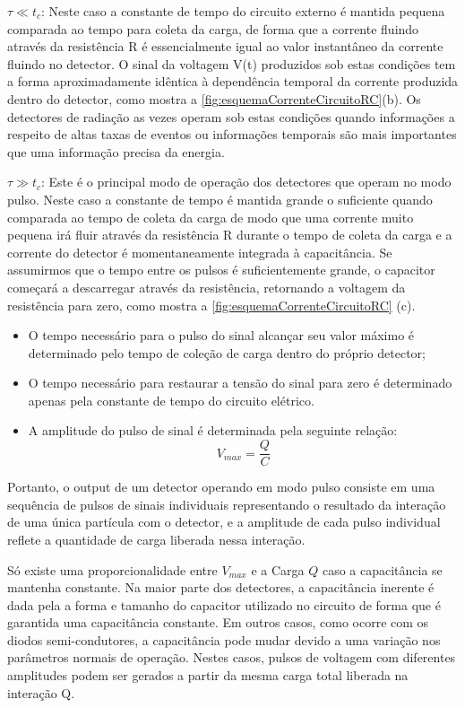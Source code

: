 \documentclass[11pt,a4paper]{article}
\begin{document}
			$\tau \ll t_c$: Neste caso a constante de tempo do circuito externo é mantida pequena comparada ao tempo para coleta da carga, de forma que a corrente fluindo através da resistência R é essencialmente igual ao valor instantâneo da corrente fluindo no detector. O sinal da voltagem V(t) produzidos sob estas condições tem a forma aproximadamente idêntica à dependência temporal da corrente produzida dentro do detector, como mostra a  \ref{fig:esquemaCorrenteCircuitoRC}(b). Os detectores de radiação as vezes operam sob estas condições quando informações a respeito de altas taxas de eventos ou informações temporais são mais importantes que uma informação precisa da energia.

			$\tau \gg t_c$: Este é o principal modo de operação dos detectores que operam no modo pulso. Neste caso a constante de tempo é mantida grande o suficiente quando comparada ao tempo de coleta da carga de modo que uma corrente muito pequena irá fluir através da resistência R durante o tempo de coleta da carga e a corrente do detector é momentaneamente integrada à capacitância. Se assumirmos que o tempo entre os pulsos é suficientemente grande, o capacitor começará a descarregar através da resistência, retornando a voltagem da resistência para zero, como mostra a  \ref{fig:esquemaCorrenteCircuitoRC} (c).


			\begin{itemize}
				\item O tempo necessário para o pulso do sinal alcançar seu valor máximo é determinado pelo tempo de coleção de carga dentro do próprio detector;
				\item O tempo necessário para restaurar a tensão do sinal para zero é determinado apenas pela constante de tempo do circuito elétrico.
				\item A amplitude do pulso de sinal é determinada pela seguinte relação:
					\begin{equation}
						V_{max} = \frac{Q}{C}
					\end{equation}
			\end{itemize}

			Portanto, o output de um detector operando em modo pulso consiste em uma sequência de pulsos de sinais individuais representando o resultado da interação de uma única partícula com o detector, e a amplitude de cada pulso individual reflete a quantidade de carga liberada nessa interação.

			Só existe uma proporcionalidade entre $V_{max}$ e a Carga $Q$ caso a capacitância se mantenha constante. Na maior parte dos detectores, a capacitância inerente é dada pela a forma e tamanho do capacitor utilizado no circuito de forma que é garantida uma capacitância constante. Em outros casos, como ocorre com os diodos semi-condutores, a capacitância pode mudar devido a uma variação nos parâmetros normais de operação. Nestes casos, pulsos de voltagem com diferentes amplitudes podem ser gerados a partir da mesma carga total liberada na interação Q. 
\end{document}
